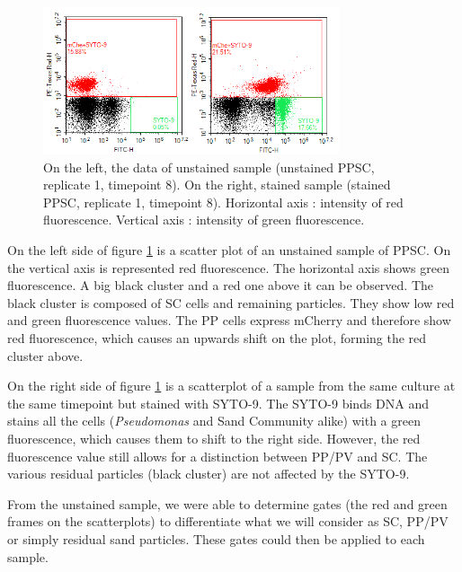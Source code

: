 \documentclass[a4paper, 10pt, conference]{ieeeconf}   %
\begin{document}
\begin{figure} [H]
	\centering
	 
		\includegraphics[width=8.7cm]{t8_unstained_ppsc11.PNG}
		\caption{On the left, the data of unstained sample (unstained PPSC, replicate 1, timepoint 8). On the right, stained sample (stained PPSC, replicate 1, timepoint 8). Horizontal axis : intensity of red fluorescence. Vertical axis : intensity of green fluorescence.}
		\label{scatterplot}
	  
\end{figure}

On the left side of figure \ref{scatterplot} is a scatter plot of an unstained sample of PPSC. On the vertical axis is represented red fluorescence. The horizontal axis shows green fluorescence. A big black cluster and a red one above it can be observed. The black cluster is composed of SC cells and remaining particles. They show  low red and green fluorescence values. The PP cells express mCherry and therefore show red fluorescence, which causes an upwards shift on the plot, forming the red cluster above.

On the right side of figure \ref{scatterplot} is a scatterplot of a sample from the same culture at the same timepoint but stained with SYTO-9. The SYTO-9 binds DNA and stains all the cells (\textit{Pseudomonas} and Sand Community alike) with a green fluorescence, which causes them to shift to the right side. However, the red fluorescence value still allows for a distinction between PP/PV and SC. The various residual particles (black cluster) are not affected by the SYTO-9. 

From the unstained sample, we were able to determine gates (the red and green frames on the scatterplots) to differentiate what we will consider as SC, PP/PV or simply residual sand particles. These gates could then be applied to each sample.
\end{document}
